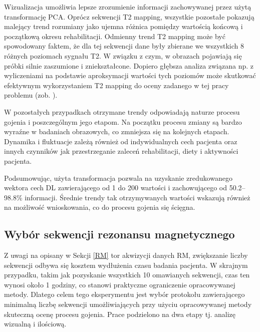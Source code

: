Wizualizacja umożliwia lepsze zrozumienie informacji zachowywanej przez użytą transformację PCA. Oprócz sekwencji T2 mapping, wszystkie pozostałe pokazują malejący trend rozumiany jako ujemna różnica pomiędzy wartością końcową i początkową okresu rehabilitacji. Odmienny trend T2 mapping może być spowodowany faktem, że dla tej sekwencji dane były zbierane we wszystkich 8 różnych poziomach sygnału T2. W związku z czym, w obrazach pojawiają się próbki silnie zaszumione i zniekształcone. Dopiero głębsza analiza związana np. z wyliczeniami na podstawie aproksymacji wartości tych poziomów może skutkować efektywnym wykorzystaniem T2 mapping do oceny zadanego w tej pracy problemu (zob. \cite{Regulski2017}). 

W pozostałych przypadkach otrzymane trendy odpowiadają naturze procesu gojenia i poszczególnym jego etapom. Na początku procesu zmiany są bardzo wyraźne w badaniach obrazowych, co zmniejsza się na kolejnych etapach. Dynamika i fluktuacje zależą również od indywidualnych cech pacjenta oraz innych czynników jak przestrzeganie zaleceń rehabilitacji, diety i aktywności pacjenta. 

Podsumowując, użyta transformacja pozwala na uzyskanie zredukowanego wektora cech DL zawierającego od 1 do 200 wartości i zachowującego od 50.2--98.8\% informacji. Średnie trendy tak otrzymywanych wartości wskazują również na możliwość wnioskowania, co do procesu gojenia się ścięgna.  


\subsection{Wybór sekwencji rezonansu magnetycznego}
\label{seq:protocol_selection}
Z uwagi na opisany w Sekcji \ref{RM} tor akwizycji danych RM, zwiększanie liczby sekwencji odbywa się kosztem wydłużenia czasu badania pacjenta. W skrajnym przypadku, takim jak pozyskanie wszystkich 10 omawianych sekwencji, czas ten wynosi około 1 godziny, co stanowi praktyczne ograniczenie opracowywanej metody. Dlatego celem tego eksperymentu jest wybór protokołu zawierającego minimalną liczbę sekwencji umożliwiających przy użyciu opracowywanej metody skuteczną ocenę procesu gojenia. Prace podzielono na dwa etapy tj. analizę wizualną i ilościową.

